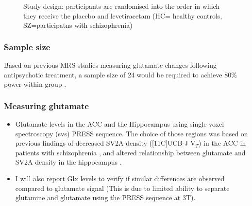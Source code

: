 \documentclass[
  letterpaper,
  DIV=11,
  numbers=noendperiod]{scrartcl}
\providecommand{\tightlist}{%
  \setlength{\itemsep}{0pt}\setlength{\parskip}{0pt}}\usepackage{longtable,booktabs,array}
\begin{document}
\begin{figure}


\caption{\label{fig-study_design}Study design: participants are
randomised into the order in which they receive the placebo and
levetiracetam (HC= healthy controls, SZ=participatns with
schizophrenia)}

\end{figure}%

\subsubsection{Sample size}\label{sample-size}

Based on previous MRS studies measuring glutamate changes following
antipsychotic treatment, a sample size of 24 would be required to
achieve 80\% power within-group \autocite{egerton_effects_2017}.

\subsubsection{Measuring glutamate}\label{measuring-glutamate}

\begin{itemize}
\tightlist
\item
  Glutamate levels in the ACC and the Hippocampus using single voxel
  spectroscopy (svs) PRESS sequence. The choice of those regions was
  based on previous findings of decreased SV2A density ({[}11C{]}UCB-J
  V\(_T\)) in the ACC in patients with schizophrenia
  \autocite{onwordi_synaptic_2020}, and altered relationship between
  glutamate and SV2A density in the hippocampus
  \autocite{onwordi_relationship_2021}.
\item
  I will also report Glx levels to verify if similar differences are
  observed compared to glutamate signal (This is due to limited ability
  to separate glutamine and glutamate using the PRESS sequence at 3T).
\end{itemize}
\end{document}
